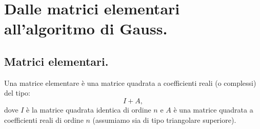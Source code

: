 
\chapter{Dalle matrici elementari all'algoritmo di Gauss.}
\section{Matrici elementari.}
Una matrice elementare è una matrice quadrata a coefficienti reali (o
complessi) del tipo:
\[ I + A,\]
dove $I$ è la matrice quadrata identica di ordine $n$ e $A$ è una matrice
quadrata a coefficienti reali di ordine $n$ (assumiamo sia di tipo triangolare
superiore).

